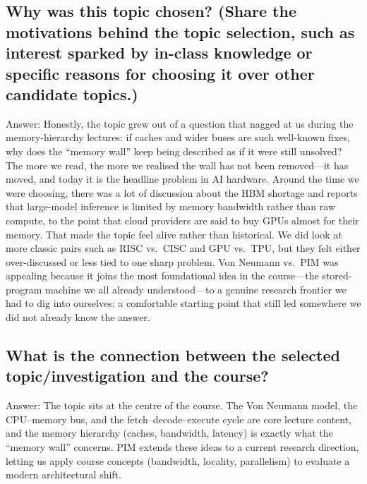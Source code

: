 \documentclass{article} %
\begin{document}
\subsection*{Why was this topic chosen? (Share the motivations behind the topic selection, such as interest sparked by in-class knowledge or specific reasons for choosing it over other candidate topics.)}
Answer: Honestly, the topic grew out of a question that nagged at us during the
memory-hierarchy lectures: if caches and wider buses are such well-known fixes,
why does the ``memory wall'' keep being described as if it were still unsolved?
The more we read, the more we realised the wall has not been removed---it has
moved, and today it is the headline problem in AI hardware. Around the time we
were choosing, there was a lot of discussion about the HBM shortage and reports
that large-model inference is limited by memory bandwidth rather than raw
compute, to the point that cloud providers are said to buy GPUs almost for their
memory. That made the topic feel alive rather than historical. We did look at
more classic pairs such as RISC vs.\ CISC and GPU vs.\ TPU, but they felt either
over-discussed or less tied to one sharp problem. Von Neumann vs.\ PIM was
appealing because it joins the most foundational idea in the course---the
stored-program machine we all already understood---to a genuine research
frontier we had to dig into ourselves: a comfortable starting point that still
led somewhere we did not already know the answer.

\subsection*{What is the connection between the selected topic/investigation and the course?}
Answer: The topic sits at the centre of the course. The Von Neumann model, the
CPU--memory bus, and the fetch--decode--execute cycle are core lecture content,
and the memory hierarchy (caches, bandwidth, latency) is exactly what the
``memory wall'' concerns. PIM extends these ideas to a current research
direction, letting us apply course concepts (bandwidth, locality, parallelism)
to evaluate a modern architectural shift.
\end{document}
